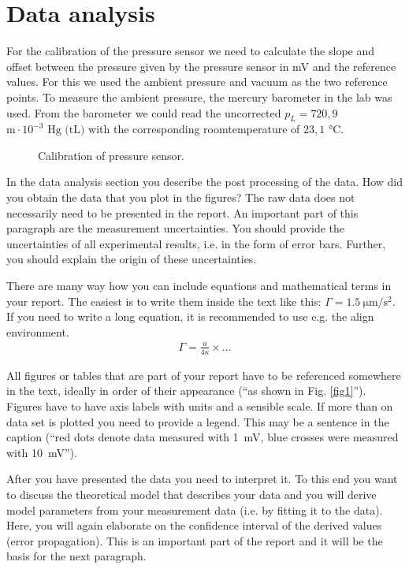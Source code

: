 \section{Data analysis}

For the calibration of the pressure sensor we need to calculate the slope and offset between the pressure given by the pressure sensor in mV and the reference values. 
For this we used the ambient pressure and vacuum as the two reference points.
To measure the ambient pressure, the mercury barometer in the lab was used.
From the barometer we could read the uncorrected $p_L = 720,9$ $\si{\m} \cdot 10^{-3} \text{  Hg (tL)}$ with the corresponding roomtemperature of $23,1$ $\si{\degreeCelsius}$. 



\begin{figure}[h!]
	\begin{center}
		
	\end{center}
	\caption{Calibration of pressure sensor.}\label{fig::cali}
\end{figure}


In the data analysis section you describe the post processing of the
data. How did you obtain the data that you plot in the figures? The raw data does not necessarily need
to be presented in the report. An important part of this paragraph
are the measurement uncertainties. You should provide the
uncertainties of all experimental results, i.e. in the form of error
bars. Further, you should explain the origin of these uncertainties.

There are many way how you can include equations and mathematical terms in your report. The easiest is to write them inside the text like this: $\Gamma =\SI{1.5}{\micro\meter\per\square\second}$. If you need to write a long equation, it is recommended to use e.g. the align environment.
\begin{align}
    \Gamma = \frac{a}{4\kappa}\times ...
\end{align}

All figures or tables that are part of your report have to be
referenced somewhere in the text, ideally in order of their
appearance (``as shown in Fig. \ref{fig1}''). Figures have to
have axis labels with units and a sensible scale. If more than on
data set is plotted you need to provide a legend. This may be a sentence in the caption (``red dots denote data measured with \SI{1}{\milli\volt}, blue crosses were measured with \SI{10}{\milli\volt}'').

After you have presented the data you need to interpret it. To this
end you want to discuss the theoretical model that describes your
data and you will derive model parameters from your measurement data
(i.e. by fitting it to the data). Here, you will again elaborate on
the confidence interval of the derived values (error propagation).
This is an important part of the report and it will be the basis for
the next paragraph.